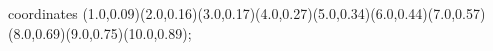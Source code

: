 					coordinates { (1.0,0.09)(2.0,0.16)(3.0,0.17)(4.0,0.27)(5.0,0.34)(6.0,0.44)(7.0,0.57)(8.0,0.69)(9.0,0.75)(10.0,0.89)};